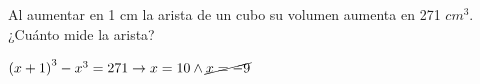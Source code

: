 \documentclass[addpoints,spanish, 12pt,a4paper]{exam}
\begin{document}
\begin{questions}

\question[1] Al  aumentar  en  1  cm  la  arista  de  un cubo  su volumen aumenta en  271 $cm^3$.  ¿Cuánto mide la arista?
\begin{solution}
$\left(x+1\right)^3-x^3=271 \to x=10 \land \cancel{x=-9}$
\end{solution}

\addpoints

\end{questions}
\end{document}
